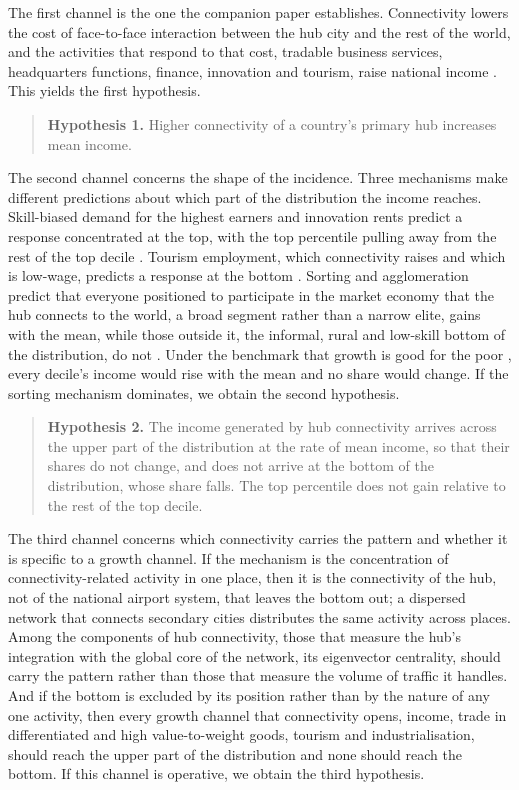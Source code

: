 The first channel is the one the companion paper establishes. Connectivity lowers the cost of face-to-face interaction between the hub city and the rest of the world, and the activities that respond to that cost, tradable business services, headquarters functions, finance, innovation and tourism, raise national income \citep{Campante_2018,Giroud_2013,Yue_2026}. This yields the first hypothesis.

\begin{quote}
\textbf{Hypothesis 1.} Higher connectivity of a country's primary hub increases mean income.
\end{quote}

The second channel concerns the shape of the incidence. Three mechanisms make different predictions about which part of the distribution the income reaches. Skill-biased demand for the highest earners and innovation rents predict a response concentrated at the top, with the top percentile pulling away from the rest of the top decile \citep{Aghion_2018}. Tourism employment, which connectivity raises and which is low-wage, predicts a response at the bottom \citep{Khadaroo_2008,Faber_2019}. Sorting and agglomeration predict that everyone positioned to participate in the market economy that the hub connects to the world, a broad segment rather than a narrow elite, gains with the mean, while those outside it, the informal, rural and low-skill bottom of the distribution, do not \citep{Diamond_2016,Gaubert_2018,Young_2013}. Under the benchmark that growth is good for the poor \citep{Dollar_2016}, every decile's income would rise with the mean and no share would change. If the sorting mechanism dominates, we obtain the second hypothesis.

\begin{quote}
\textbf{Hypothesis 2.} The income generated by hub connectivity arrives across the upper part of the distribution at the rate of mean income, so that their shares do not change, and does not arrive at the bottom of the distribution, whose share falls. The top percentile does not gain relative to the rest of the top decile.
\end{quote}

The third channel concerns which connectivity carries the pattern and whether it is specific to a growth channel. If the mechanism is the concentration of connectivity-related activity in one place, then it is the connectivity of the hub, not of the national airport system, that leaves the bottom out; a dispersed network that connects secondary cities distributes the same activity across places. Among the components of hub connectivity, those that measure the hub's integration with the global core of the network, its eigenvector centrality, should carry the pattern rather than those that measure the volume of traffic it handles. And if the bottom is excluded by its position rather than by the nature of any one activity, then every growth channel that connectivity opens, income, trade in differentiated and high value-to-weight goods, tourism and industrialisation, should reach the upper part of the distribution and none should reach the bottom. If this channel is operative, we obtain the third hypothesis.

